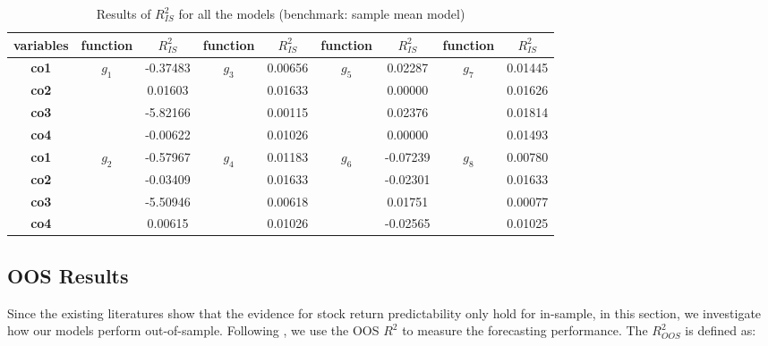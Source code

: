 \documentclass[a4paper,12pt,times,numbered,print,index]{report}
\numberwithin{equation}{section}
\begin{document}
\begin{table}[!htbp]
	\centering
	\caption{Results of $R^2_{IS}$ for all the models (benchmark: sample mean model)}
	\begin{adjustbox}{max width=\textwidth}
	\begin{tabular}{ccccccccc}
		\toprule
		\textbf{variables} & \textbf{function} & \textbf{$R^2_{IS}$} & \textbf{function} & \textbf{$R^2_{IS}$} & \textbf{function} & \textbf{$R^2_{IS}$} & \textbf{function} & \textbf{$R^2_{IS}$} \\
		\midrule
		\textbf{co1} & \multirow{4}[1]{*}{\textbf{$g_1$}} & -0.37483 & \multirow{4}[1]{*}{\textbf{$g_3$}} & 0.00656 & \multirow{4}[1]{*}{\textbf{$g_5$}} & 0.02287 & \multirow{4}[1]{*}{\textbf{$g_7$}} & 0.01445 \\
		\textbf{co2} &       & 0.01603 &       & 0.01633 &       & 0.00000 &       & 0.01626 \\
		\textbf{co3} &       & -5.82166 &       & 0.00115 &       & 0.02376 &       & 0.01814 \\
		\textbf{co4} &       & -0.00622 &       & 0.01026 &       & 0.00000 &       & 0.01493 \\
		\midrule
		\textbf{co1} & \multirow{4}[1]{*}{\textbf{$g_2$}} & -0.57967 & \multirow{4}[1]{*}{\textbf{$g_4$}} & 0.01183 & \multirow{4}[1]{*}{\textbf{$g_6$}} & -0.07239 & \multirow{4}[1]{*}{\textbf{$g_8$}} & 0.00780 \\
		\textbf{co2} &       & -0.03409 &       & 0.01633 &       & -0.02301 &       & 0.01633 \\
		\textbf{co3} &       & -5.50946 &       & 0.00618 &       & 0.01751 &       & 0.00077 \\
		\textbf{co4} &       & 0.00615 &       & 0.01026 &       & -0.02565 &       & 0.01025 \\
		\bottomrule
		\bottomrule
	\end{tabular}%
	\end{adjustbox}
\label{ins_R2}%
\end{table}%


\subsection{OOS Results}
Since the existing literatures show that the evidence for stock return predictability only hold for in-sample, in this section, we investigate how our models perform out-of-sample. Following \cite{campbell2008predicting}, we use the OOS $R^2$ to measure the forecasting performance. The $R^2_{OOS}$ is defined as:
\end{document}
